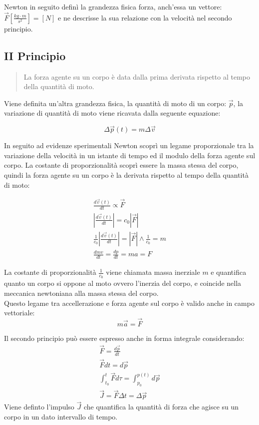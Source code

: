 \documentclass{article}
\numberwithin{equation}{subsection}
\begin{document}
Newton in seguito definì la grandezza fisica forza, anch'essa un 
vettore: $\vec{F}\left[\displaystyle
\frac{kg\cdot m}{s^{2}}\right]=\left[N\right]$ e ne descrisse 
la sua relazione con la velocità nel secondo principio.

\subsection{II Principio}
\begin{quotation}
    La forza agente su un corpo è data dalla prima derivata 
    rispetto al tempo della quantità di moto.
\end{quotation}
Viene definita un'altra grandezza fisica, la quantità di moto 
di un corpo: $\vec{p}$, la variazione di quantità di moto 
viene ricavata dalla seguente equazione:

\begin{equation}
    \Delta\vec{p}(t)=m\Delta\vec{v}
\end{equation}

In seguito ad evidenze sperimentali Newton scoprì un legame 
proporzionale tra la variazione della velocità in un istante di tempo 
ed il modulo della forza agente sul corpo. La costante di proporzionalità 
scoprì essere la massa stessa del corpo, quindi la forza agente 
su un corpo è la derivata rispetto al tempo della quantità di 
moto:

\begin{gather}
    \displaystyle\frac{d\vec{v}(t)}{dt}\propto\vec{F}\\
    \left|\displaystyle\frac{d\vec{v}(t)}{dt}\right|=c_0\left|\vec{F}\right|\\
    \frac{1}{c_0} \left|\displaystyle\frac{d\vec{v}(t)}{dt}\right|=\left|\vec{F}\right|\land\frac{1}{c_0}=m\\
    \displaystyle\frac{dmv}{dt}=\frac{dp}{dt}=ma=F
\end{gather}

La costante di proporzionalità $\displaystyle\frac{1}{c_0}$ viene chiamata massa 
inerziale $m$ e quantifica quanto un corpo si oppone al moto ovvero l'inerzia 
del corpo, e 
coincide nella meccanica newtoniana alla massa stessa del corpo.\\
Questo legame tra accellerazione e forza agente sul corpo è valido 
anche in campo vettoriale: 
\begin{equation}
    m\vec{a}=\vec{F}
\end{equation}

Il secondo principio può essere espresso anche in forma integrale 
considerando: 
\begin{gather}
    \vec{F}=\displaystyle\frac{d\vec{p}}{dt}\\
    \vec{F}dt=d\vec{p}\\
    \displaystyle\int_{t_0}^{t}\vec{F}d\tau=\int_{p_0}^{p(t)}d\vec{p}\\
    \vec{J}=\vec{F}\Delta t=\Delta\vec{p}
\end{gather}
Viene definto l'impulso $\vec{J}$ che quantifica la quantità 
di forza che agisce su un corpo in un dato intervallo di tempo.
\end{document}
